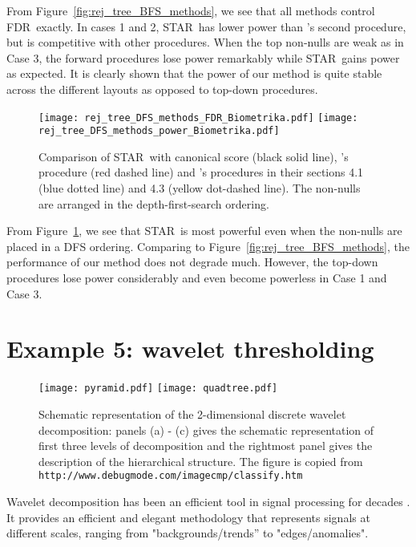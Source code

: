 \documentclass{biometrika}
\newcommand{\textFDR}{FDR}
\renewcommand{\star}{STAR}
\newcommand{\1}{\mathbf{1}}
\begin{document}
From Figure~\ref{fig:rej_tree_BFS_methods}, we see that all methods control \textFDR ~exactly. In cases 1 and 2, \star ~has lower power than \cite{lynch16}'s second procedure, but is competitive with other procedures. When the top non-nulls are weak as in Case 3, the forward procedures lose power remarkably while \star ~gains power as expected. It is clearly shown that the power of our method is quite stable across the different layouts as opposed to top-down procedures.

\begin{figure}[h!]
  \centering
  \texttt{[image: rej\_tree\_DFS\_methods\_FDR\_Biometrika.pdf]}
  \texttt{[image: rej\_tree\_DFS\_methods\_power\_Biometrika.pdf]}
  \caption{Comparison of \star ~with canonical score (black solid line), \cite{yekutieli08}'s procedure (red dashed line) and \cite{lynch16}'s procedures in their sections 4.1 (blue dotted line) and 4.3 (yellow dot-dashed line). The non-nulls are arranged in the depth-first-search ordering.}\label{fig:rej_tree_DFS_methods}
\end{figure}

From Figure~\ref{fig:rej_tree_DFS_methods}, we see that \star ~is most powerful even when the non-nulls are placed in a DFS ordering. Comparing to Figure~\ref{fig:rej_tree_BFS_methods}, the performance of our method does not degrade much. However, the top-down procedures lose power considerably and even become powerless in Case 1 and Case 3. 

\section{Example 5: wavelet thresholding}\label{sec:wavelet}

\begin{figure}[h]
  \centering
  \texttt{[image: pyramid.pdf]}
  \texttt{[image: quadtree.pdf]}
  \caption{Schematic representation of the 2-dimensional discrete wavelet decomposition: panels (a) - (c) gives the schematic representation of first three levels of decomposition and the rightmost panel gives the description of the hierarchical structure. The figure is copied from \texttt{http://www.debugmode.com/imagecmp/classify.htm}}\label{fig:pyramid}
\end{figure}

Wavelet decomposition has been an efficient tool in signal processing for decades \citep[e.g.,][and references therein]{mallat99}.
 It provides an efficient and elegant methodology that represents signals at different scales, ranging from "backgrounds/trends'' to "edges/anomalies".
\end{document}
